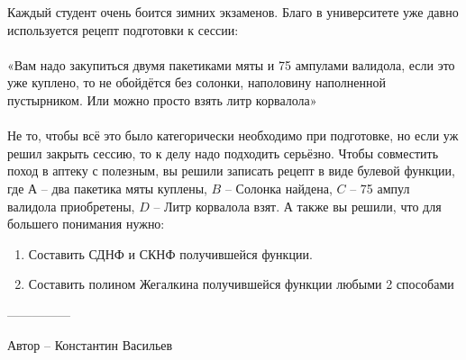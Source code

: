 \question
Каждый студент очень боится зимних экзаменов. Благо в университете уже давно используется рецепт подготовки к сессии:
\\
\\
«Вам надо закупиться двумя пакетиками мяты и 75 ампулами валидола, если это уже куплено, то не обойдётся без солонки, наполовину наполненной пустырником. Или можно просто взять литр корвалола»
\\
\\
Не то, чтобы всё это было категорически необходимо при подготовке, но если уж решил закрыть сессию, то к делу надо подходить серьёзно. Чтобы совместить поход в аптеку с полезным, вы решили записать рецепт в виде булевой функции, где $А$ – два пакетика мяты куплены, $B$ – Солонка найдена, $C$ – 75 ампул валидола приобретены, $D$ – Литр корвалола взят. А также вы решили, что для большего понимания нужно:
\begin{enumerate}
    \item Составить СДНФ и СКНФ получившейся функции.
    \item Составить полином Жегалкина получившейся функции любыми 2 способами
\end{enumerate}

---------------

Автор -- Константин Васильев